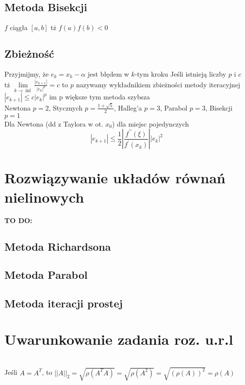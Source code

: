 \documentclass[twocolumn]{article}
\begin{document}
\begin{flushleft}
\subsection{Metoda Bisekcji}
$f$ ciągła $[a,b]$ tż $f(a)f(b) < 0$ 
\begin{algorithmic}
	\ELSE
	\ENDIF
\ENDFOR
\end{algorithmic}
\subsection{Zbieżność}
Przyjmijmy, że $e_k=x_k - \alpha$ jest błędem w $k$-tym kroku Jeśli istnieją liczby $p$ i $c$ tż $\underset{k \to \inf}{\lim}\frac{|e_{k+1}|}{|e_k|^p}=c$ to $p$ nazywamy wykładnikiem zbieżności metody iteracyjnej\\
$|e_{k+1}| \leq c|e_k|^p$ im p większe tym metoda szybsza\\
Newtona $p=2$, Stycznych $p=\frac{1+\sqrt{5}}{2}$, Halleg'a $p=3$, Parabol $p=3$, Bisekcji $p=1$\\
Dla Newtona (dd z Taylora w ot. $x_0$) dla miejsc pojedynczych
$$|e_{k+1}|\leq \frac{1}{2}\left| \frac{f^{\prime \prime}(\xi)}{f^{\prime}(x_k)}\right| |e_k|^2$$
\section{Rozwiązywanie układów równań nielinowych}
\large{\textbf{TO DO:}}
\subsection{Metoda Richardsona}
\subsection{Metoda Parabol}
\subsection{Metoda iteracji prostej}
\section{Uwarunkowanie zadania roz. u.r.l}
\\
Jeśli $A=A^T$, to $||A||_2 = \sqrt{\rho(A^TA)}=\sqrt{\rho(A^2)} =\sqrt{(\rho(A))^2}=\rho(A)$\\
\end{flushleft}
\end{document}
